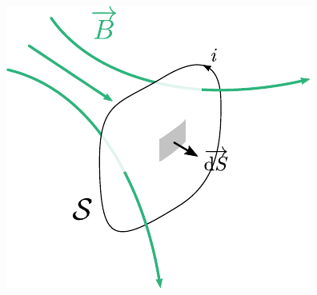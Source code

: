 \documentclass[../../main/main.tex]{subfiles}
\begin{document}
\begin{tcb*}[sidebyside, righthand ratio=.4]
\begin{center}
{			\includegraphics[width=\linewidth]{fluxdef_var}
		}
	\end{center}
\end{tcb*}

\end{document}
